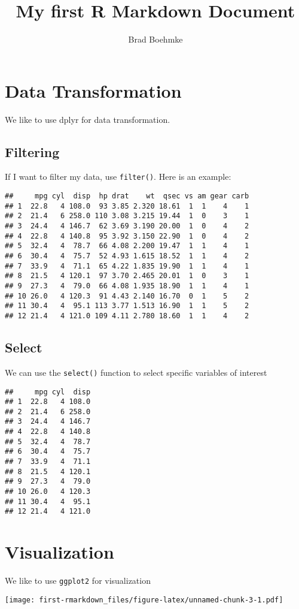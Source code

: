 \documentclass[]{article}
\title{My first R Markdown Document}
\author{Brad Boehmke}
\date{}
\begin{document}
\maketitle

\hypertarget{data-transformation}{%
\section{Data Transformation}\label{data-transformation}}

We like to use dplyr for data transformation.

\hypertarget{filtering}{%
\subsection{Filtering}\label{filtering}}

If I want to filter my data, use \texttt{filter()}. Here is an example:

\begin{verbatim}
##     mpg cyl  disp  hp drat    wt  qsec vs am gear carb
## 1  22.8   4 108.0  93 3.85 2.320 18.61  1  1    4    1
## 2  21.4   6 258.0 110 3.08 3.215 19.44  1  0    3    1
## 3  24.4   4 146.7  62 3.69 3.190 20.00  1  0    4    2
## 4  22.8   4 140.8  95 3.92 3.150 22.90  1  0    4    2
## 5  32.4   4  78.7  66 4.08 2.200 19.47  1  1    4    1
## 6  30.4   4  75.7  52 4.93 1.615 18.52  1  1    4    2
## 7  33.9   4  71.1  65 4.22 1.835 19.90  1  1    4    1
## 8  21.5   4 120.1  97 3.70 2.465 20.01  1  0    3    1
## 9  27.3   4  79.0  66 4.08 1.935 18.90  1  1    4    1
## 10 26.0   4 120.3  91 4.43 2.140 16.70  0  1    5    2
## 11 30.4   4  95.1 113 3.77 1.513 16.90  1  1    5    2
## 12 21.4   4 121.0 109 4.11 2.780 18.60  1  1    4    2
\end{verbatim}

\hypertarget{select}{%
\subsection{Select}\label{select}}

We can use the \texttt{select()} function to select specific variables
of interest

\begin{verbatim}
##     mpg cyl  disp
## 1  22.8   4 108.0
## 2  21.4   6 258.0
## 3  24.4   4 146.7
## 4  22.8   4 140.8
## 5  32.4   4  78.7
## 6  30.4   4  75.7
## 7  33.9   4  71.1
## 8  21.5   4 120.1
## 9  27.3   4  79.0
## 10 26.0   4 120.3
## 11 30.4   4  95.1
## 12 21.4   4 121.0
\end{verbatim}

\hypertarget{visualization}{%
\section{Visualization}\label{visualization}}

We like to use \texttt{ggplot2} for visualization

\texttt{[image: first-rmarkdown\_files/figure-latex/unnamed-chunk-3-1.pdf]}
\end{document}
